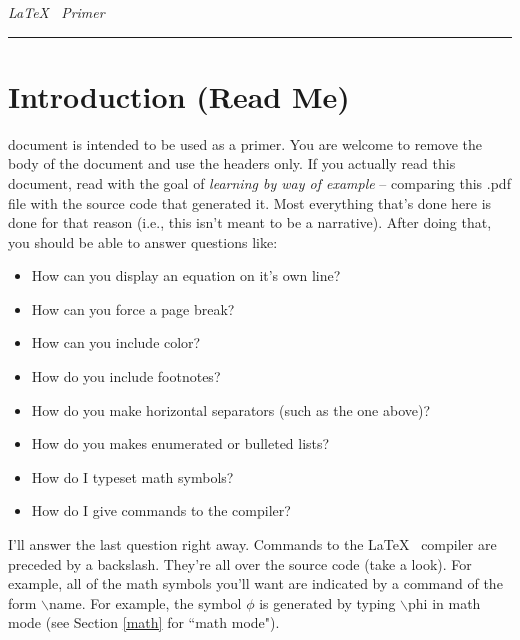 \documentclass[12pt]{report} %
\begin{document}
\thispagestyle{plain}	%


\begin{center}
{\Huge {\it \LaTeX~ Primer}}\\
\rule{\textwidth}{0.1mm}
\end{center}
\setcounter{chapter}{1} 
\section{Introduction (Read Me)}
\label{intro} %

 document is intended to be used as a primer.  You are welcome to 
remove the body of the document and use the headers only.  If you actually read 
this document, read with the goal of {\it learning by way of example} -- comparing 
this .pdf file with the source code that generated it.  Most everything that's done 
here is done for that reason (i.e., this isn't meant to be a narrative).  After doing 
that, you should be able to answer questions like:

\begin{itemize}
\item How can you display an equation on it's own line?  
\item How can you force a page break?  
\item How can you include color?  
\item How do you include footnotes?  
\item How do you make horizontal separators (such as the one above)?  
\item How do you makes enumerated or bulleted lists?
\item How do I typeset math symbols?
\item How do I give commands to the compiler?
\end{itemize}

I'll answer the last question right away.  Commands to the \LaTeX~ compiler  
are preceded by a backslash.  They're all over the source code (take a look).  For 
example, all of the math symbols you'll want are indicated by a command of the 
form $\backslash$name.  For example, the symbol $\phi$ is generated by typing $\backslash$phi in math mode (see Section \ref{math} for ``math mode").
\end{document}
